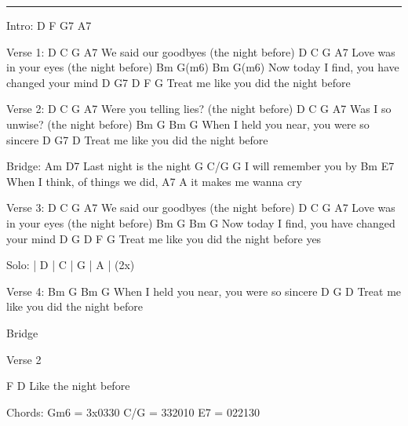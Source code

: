 \noindent\rule{\columnwidth}{1pt}

\begin{multicols}{2}
\begin{lstsong}
Intro: D F G7 A7

Verse 1:
D               C   G     A7
We said our goodbyes (the night before)
D                C   G     A7
Love was in your eyes (the night before) 
Bm          G(m6) Bm                    G(m6)
Now today I find, you have changed your mind
D                 G7              D    F  G
Treat me like you did the night before

Verse 2:
D                C   G      A7
Were you telling lies? (the night before)
D          C   G      A7
Was I so unwise? (the night before)
Bm              G     Bm             G
When I held you near, you were so sincere
D                 G7              D
Treat me like you did the night before

Bridge:
Am                D7
Last night is the night
         G      C/G G
I will remember you by
Bm               E7
When I think, of things we did,
    A7             A
it makes me wanna cry

Verse 3:
D              C   G      A7
We said our goodbyes (the night before)
D                C  G      A7
Love was in your eyes (the night before)
Bm          G     Bm                    G
Now today I find, you have changed your mind
D                 G               D    F G
Treat me like you did the night before   yes

Solo: | D | C | G | A | (2x)

Verse 4:
Bm              G     Bm             G
When I held you near, you were so sincere
D                 G               D
Treat me like you did the night before

Bridge

Verse 2

         F       D
Like the night before


Chords:
Gm6  =  3x0330
C/G  =  332010
E7   =  022130
\end{lstsong}
\end{multicols}
\newpage

